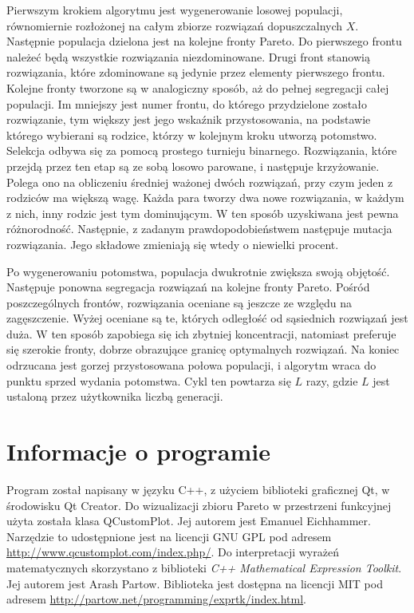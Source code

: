 \documentclass[11pt,a4paper]{article}
\begin{document}
Pierwszym krokiem algorytmu jest wygenerowanie losowej populacji, równomiernie rozłożonej na całym zbiorze rozwiązań dopuszczalnych \(X\). Następnie populacja dzielona jest na kolejne fronty Pareto. Do pierwszego frontu należeć będą wszystkie rozwiązania niezdominowane. Drugi front stanowią rozwiązania, które zdominowane są jedynie przez elementy pierwszego frontu. Kolejne fronty tworzone są w analogiczny sposób, aż do pełnej segregacji całej populacji. Im mniejszy jest numer frontu, do którego przydzielone zostało rozwiązanie, tym większy jest jego wskaźnik przystosowania, na podstawie którego wybierani są rodzice, którzy  w kolejnym kroku utworzą potomstwo. Selekcja odbywa się za pomocą prostego turnieju binarnego. Rozwiązania, które przejdą przez ten etap są ze sobą losowo parowane, i następuje krzyżowanie. Polega ono na obliczeniu średniej ważonej dwóch rozwiązań, przy czym jeden z rodziców ma większą wagę. Każda para tworzy dwa nowe rozwiązania, w każdym z nich, inny rodzic jest tym dominującym. W ten sposób uzyskiwana jest pewna różnorodność. Następnie, z zadanym prawdopodobieństwem następuje mutacja rozwiązania. Jego składowe zmieniają się wtedy o niewielki procent. 

Po wygenerowaniu potomstwa, populacja dwukrotnie zwiększa swoją objętość. Następuje ponowna segregacja rozwiązań na kolejne fronty Pareto. Pośród poszczególnych frontów, rozwiązania oceniane są jeszcze ze względu na zagęszczenie. Wyżej oceniane są te, których odległość od sąsiednich rozwiązań jest duża. W ten sposób zapobiega się ich zbytniej koncentracji, natomiast preferuje się szerokie fronty, dobrze obrazujące granicę optymalnych rozwiązań. Na koniec odrzucana jest gorzej przystosowana połowa populacji, i algorytm wraca do punktu sprzed wydania potomstwa. Cykl ten powtarza się \(L\) razy, gdzie \(L\) jest ustaloną przez użytkownika liczbą generacji.

\section{Informacje o programie}
Program został napisany w języku C++, z użyciem biblioteki graficznej Qt, w środowisku Qt Creator. Do wizualizacji zbioru Pareto w przestrzeni funkcyjnej użyta została klasa QCustomPlot. Jej autorem jest Emanuel Eichhammer. Narzędzie to udostępnione jest na licencji GNU GPL pod adresem \url{http://www.qcustomplot.com/index.php/}. Do interpretacji wyrażeń matematycznych skorzystano z biblioteki \textit{C++ Mathematical Expression Toolkit}. Jej autorem jest Arash Partow. Biblioteka jest dostępna na licencji MIT pod adresem 
\url{http://partow.net/programming/exprtk/index.html}. 
\end{document}
